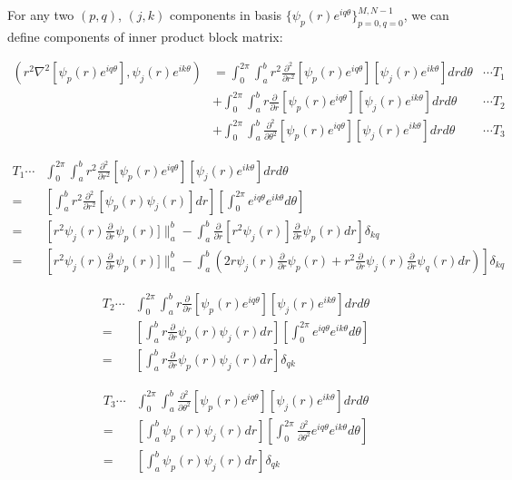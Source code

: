 \documentclass[11pt,letterpaper]{article}
\begin{document}
For any two $(p,q)$, $(j,k)$ components in basis $\{\psi_p(r)
e^{iq\theta}\}_{p=0, q=0}^{M, N-1}$, we can define components of
inner product block matrix:


\begin{align*}
\left( r^2 \nabla^2 \left[ \psi_p(r) e^{iq\theta} \right],
\psi_j(r)e^{ik\theta} \right)
& =\int_{0}^{2\pi}\int_{a}^{b}
r^2\frac{\partial^2}{\partial r^2} \left[ \psi_p(r)
e^{iq\theta}\right]
\left[ \psi_j(r)e^{ik\theta} \right] dr d\theta &\cdots T_1\\
& + \int_{0}^{2\pi}\int_{a}^{b} r\frac{\partial}{\partial r}\left[
\psi_p(r) e^{iq\theta}\right]
\left[ \psi_j(r)e^{ik\theta}\right] dr d\theta  &\cdots T_2\\
& + \int_{0}^{2\pi}\int_{a}^{b} \frac{\partial^2}{\partial
\theta^2} \left[ \psi_p(r) e^{iq\theta}\right] \left[
\psi_j(r)e^{ik\theta}\right] dr d\theta         &\cdots T_3
\end{align*}
\newline

\begin{align*}
T_1\cdots & \int_{0}^{2\pi}\int_{a}^{b}
r^2\frac{\partial^2}{\partial r^2} \left[ \psi_p(r)
e^{iq\theta}\right]
\left[ \psi_j(r)e^{ik\theta} \right] dr d\theta \\
=& \left[ \int_{a}^{b}r^2\frac{\partial^2}{\partial r^2} \left[
\psi_p(r) \psi_j(r) \right] dr \right] \left[ \int_{0}^{2\pi}
e^{iq\theta}e^{ik\theta}d\theta \right] \\
=& \left[ r^2 \psi_j(r)\frac{\partial}{\partial r} \psi_p(r)
]\|_{a}^{b} - \int_{a}^{b}\frac{\partial}{\partial r}\left[ r^2
\psi_j(r)\right] \frac{\partial}{\partial r} \psi_p(r) dr \right]
\delta_{kq} \\
=& \left[ r^2 \psi_j(r)\frac{\partial}{\partial r} \psi_p(r)
]\|_{a}^{b} - \int_{a}^{b} ( 2r \psi_j(r) \frac{\partial}{\partial
r} \psi_p(r) + r^2\frac{\partial}{\partial r} \psi_j(r)
\frac{\partial}{\partial r} \psi_q(r)dr )\right] \delta_{kq}
\end{align*}

\begin{align*}
T_2\cdots & \int_{0}^{2\pi}\int_{a}^{b} r\frac{\partial}{\partial
r}\left[ \psi_p(r) e^{iq\theta}\right]
\left[ \psi_j(r)e^{ik\theta}\right] dr d\theta\\
=& \left[ \int_{a}^{b} r\frac{\partial}{\partial r}\psi_p(r)
\psi_j(r) dr \right] \left[ \int_{0}^{2\pi} e^{iq\theta}  e^{ik\theta}  d\theta \right] \\
=& \left[ \int_{a}^{b} r\frac{\partial}{\partial r}\psi_p(r)
\psi_j(r) dr \right] \delta_{qk}
\end{align*}

\begin{align*}
T_3\cdots & \int_{0}^{2\pi}\int_{a}^{b} \frac{\partial^2}{\partial
\theta^2} \left[ \psi_p(r) e^{iq\theta}\right] \left[
\psi_j(r)e^{ik\theta}\right] dr d\theta \\
=& \left[ \int_{a}^{b} \psi_p(r) \psi_j(r) dr \right] \left[
\int_{0}^{2\pi} \frac{\partial^2}{\partial \theta^2} e^{iq\theta}
e^{ik\theta} d\theta \right] \\
=& \left[ \int_{a}^{b} \psi_p(r) \psi_j(r) dr \right] \delta_{qk} \\
\end{align*}
\end{document}
